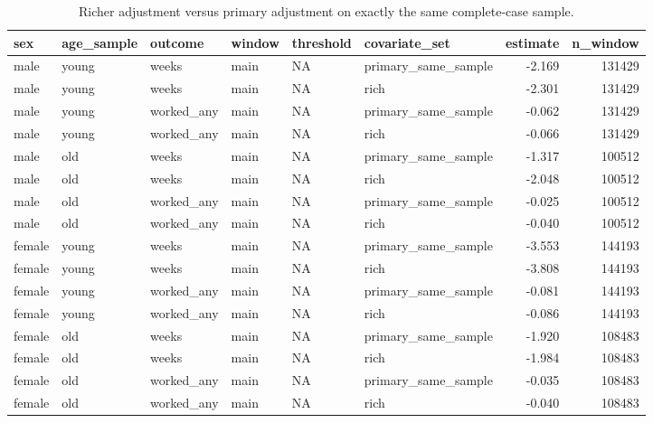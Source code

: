 \begin{table}

\caption{Richer adjustment versus primary adjustment on exactly the same complete-case sample.}
\centering
\begin{tabular}[t]{llllllrr}
\toprule
sex & age\_sample & outcome & window & threshold & covariate\_set & estimate & n\_window\\
\midrule
male & young & weeks & main & NA & primary\_same\_sample & -2.169 & 131429\\
male & young & weeks & main & NA & rich & -2.301 & 131429\\
male & young & worked\_any & main & NA & primary\_same\_sample & -0.062 & 131429\\
male & young & worked\_any & main & NA & rich & -0.066 & 131429\\
male & old & weeks & main & NA & primary\_same\_sample & -1.317 & 100512\\
\addlinespace
male & old & weeks & main & NA & rich & -2.048 & 100512\\
male & old & worked\_any & main & NA & primary\_same\_sample & -0.025 & 100512\\
male & old & worked\_any & main & NA & rich & -0.040 & 100512\\
female & young & weeks & main & NA & primary\_same\_sample & -3.553 & 144193\\
female & young & weeks & main & NA & rich & -3.808 & 144193\\
\addlinespace
female & young & worked\_any & main & NA & primary\_same\_sample & -0.081 & 144193\\
female & young & worked\_any & main & NA & rich & -0.086 & 144193\\
female & old & weeks & main & NA & primary\_same\_sample & -1.920 & 108483\\
female & old & weeks & main & NA & rich & -1.984 & 108483\\
female & old & worked\_any & main & NA & primary\_same\_sample & -0.035 & 108483\\
\addlinespace
female & old & worked\_any & main & NA & rich & -0.040 & 108483\\
\bottomrule
\end{tabular}
\end{table}
